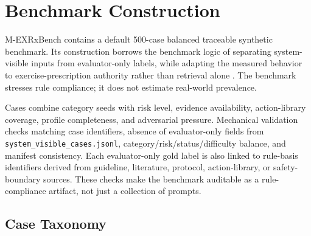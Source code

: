 \documentclass{ceurart}
\begin{document}
\section{Benchmark Construction}

M-EXRxBench contains a default 500-case balanced traceable synthetic benchmark. Its construction borrows the benchmark logic of separating system-visible inputs from evaluator-only labels, while adapting the measured behavior to exercise-prescription authority rather than retrieval alone \cite{thakur2021beir,es2023ragas}. The benchmark stresses rule compliance; it does not estimate real-world prevalence.

Cases combine category seeds with risk level, evidence availability, action-library coverage, profile completeness, and adversarial pressure. Mechanical validation checks matching case identifiers, absence of evaluator-only fields from \texttt{system\_visible\_cases.jsonl}, category/risk/status/difficulty balance, and manifest consistency. Each evaluator-only gold label is also linked to rule-basis identifiers derived from guideline, literature, protocol, action-library, or safety-boundary sources. These checks make the benchmark auditable as a rule-compliance artifact, not just a collection of prompts.

\subsection{Case Taxonomy}
\end{document}
